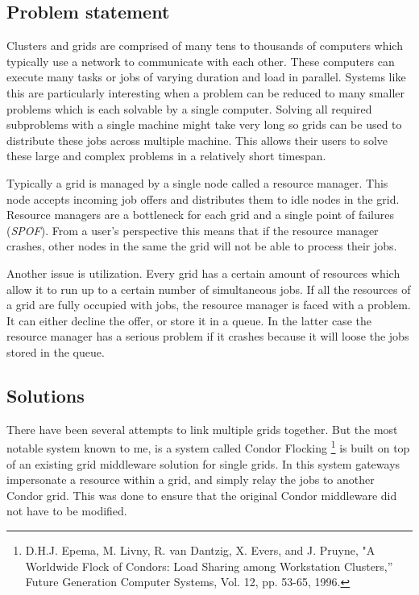 \documentclass{article}
\begin{document}
\subsection{Problem statement}
Clusters and grids are comprised of many tens to thousands of computers which typically use a network to communicate with each other. These computers can execute many tasks or jobs of varying duration and load in parallel. Systems like this are particularly interesting when a problem can be reduced to many smaller problems which is each solvable by a single computer. Solving all required subproblems with a single machine might take very long so grids can be used to distribute these jobs across multiple machine. This allows their users to solve these large and complex problems in a relatively short timespan. 

Typically a grid is managed by a single node called a resource manager. This node accepts incoming job offers and distributes them to idle nodes in the grid. Resource managers are a bottleneck for each grid and a single point of failures (\textit{SPOF}). From a user's perspective this means that if the resource manager crashes, other nodes in the same the grid will not be able to process their jobs.

Another issue is utilization. Every grid has a certain amount of resources which allow it to run up to a certain number of simultaneous jobs. If all the resources of a grid are fully occupied with jobs, the resource manager is faced with a problem. It can either decline the offer, or store it in a queue. In the latter case the resource manager has a serious problem if it crashes because it will loose the jobs stored in the queue.

\subsection{Solutions}
There have been several attempts to link multiple grids together. But the most notable system known to me, is a system called Condor Flocking \footnote{D.H.J. Epema, M. Livny, R. van Dantzig, X. Evers, and J. Pruyne, "A Worldwide Flock of Condors: Load Sharing among Workstation Clusters,” Future Generation Computer Systems, Vol. 12, pp. 53-65, 1996.} is built on top of an existing grid middleware solution for single grids. In this system gateways impersonate a resource within a grid, and simply relay the jobs to another Condor grid. This was done to ensure that the original Condor middleware did not have to be modified.
\end{document}
